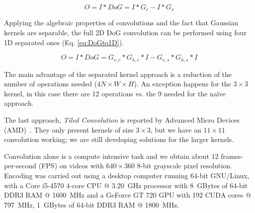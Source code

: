 \begin{equation}
O = I \ast DoG = I \ast G_{c} - I \ast G_{s}
\label{eq:DoG2G}
\end{equation}

Applying the algebraic properties of convolutions and the fact that Gaussian kernels are separable, the full 2D DoG convolution can be performed using four 1D separated ones (Eq. \ref{eq:DoGto1D}).

\begin{equation}
O = I \ast DoG = G_{v,c} \ast G_{h,c} \ast I - G_{v,s} \ast G_{h,s} \ast I 
\label{eq:DoGto1D}
\end{equation}

The main advantage of the separated kernel approach is a reduction of the number of operations needed ($4N\times W \times H$). An exception happens for the $3\times 3$ kernel, in this case there are 12 operations vs. the 9 needed for the naïve approach.


The last approach, \emph{Tiled Convolution} is reported by Advanced Micro Devices (AMD)~\cite{tiled-convolution}. They only present kernels of size $3\times3$, but we have an $11\times11$ convolution working; we are still developing solutions for the larger kernels. 



Convolution alone is a compute intensive task and we obtain about 12 frames-per-second (FPS) on videos with $640\times360$ 8-bit grayscale pixel resolution. Encoding was carried out using a desktop computer running 64-bit GNU/Linux, with a Core i5-4570 4-core CPU @ 3.20~GHz processor with 8~GBytes of 64-bit DDR3 RAM @ 1600~MHz and a GeForce GT 720 GPU with 192 CUDA cores @ 797~MHz, 1~GBytes of 64-bit DDR3 RAM @ 1800~MHz. %

